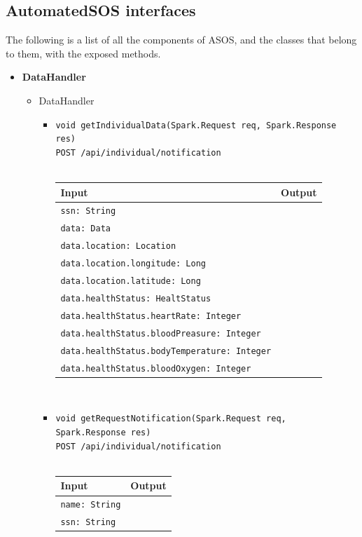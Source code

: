\documentclass[a4paper, hidelinks, 12pt]{report}
\begin{document}
\subsection{AutomatedSOS interfaces}
	The following is a list of all the components of ASOS, and the classes that belong to them, with the exposed methods.
	\begin{itemize}
		\item{\textbf{DataHandler}}
			\begin{itemize}
				\item{DataHandler}
					\begin{itemize}
						\item{\verb|void getIndividualData(Spark.Request req, Spark.Response res)|\\ \verb|POST /api/individual/notification|}\\\\
				\begin{tabular}{l | l}
				\textbf{Input} & \textbf{Output} \\
				\hline
					\verb|ssn: String| & \\
					\verb|data: Data| & \\
					\verb|data.location: Location| & \\
					\verb|data.location.longitude: Long| & \\
					\verb|data.location.latitude: Long| & \\
					\verb|data.healthStatus: HealtStatus| & \\
					\verb|data.healthStatus.heartRate: Integer| & \\
					\verb|data.healthStatus.bloodPreasure: Integer| & \\
					\verb|data.healthStatus.bodyTemperature: Integer| & \\
					\verb|data.healthStatus.bloodOxygen: Integer| & \\
				\end{tabular}\\
				\item{\verb|void getRequestNotification(Spark.Request req, Spark.Response res)|\\ \verb|POST /api/individual/notification|}\\\\
				\begin{tabular}{l | l}
				\textbf{Input} & \textbf{Output} \\
				\hline
					\verb|name: String| & \\
					\verb|ssn: String| & \\

\end{tabular}
\end{itemize}
\end{itemize}
\end{itemize}
\end{document}
